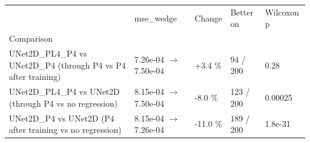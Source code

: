 \begin{tabular}{lllll}
\toprule
 & mse\_wedge & Change & Better on & Wilcoxon p \\
Comparison &  &  &  &  \\
\midrule
UNet2D\_PL4\_P4 vs UNet2D\_P4 (through P4 vs P4 after training) & 7.26e-04 $\rightarrow$ 7.50e-04 & +3.4 \% & 94 / 200 & 0.28 \\
UNet2D\_PL4\_P4 vs UNet2D (through P4 vs no regression) & 8.15e-04 $\rightarrow$ 7.50e-04 & -8.0 \% & 123 / 200 & 0.00025 \\
UNet2D\_P4 vs UNet2D (P4 after training vs no regression) & 8.15e-04 $\rightarrow$ 7.26e-04 & -11.0 \% & 189 / 200 & 1.8e-31 \\
\bottomrule
\end{tabular}
